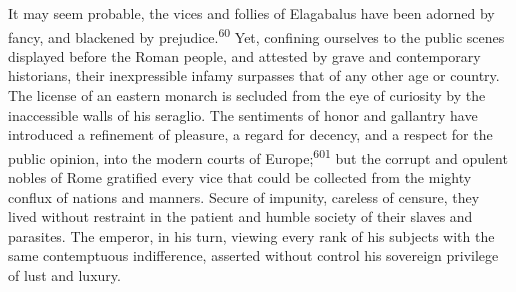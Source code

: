 
It may seem probable, the vices and follies of Elagabalus have
been adorned by fancy, and blackened by prejudice.\textsuperscript{60} Yet,
confining ourselves to the public scenes displayed before the
Roman people, and attested by grave and contemporary historians,
their inexpressible infamy surpasses that of any other age or
country. The license of an eastern monarch is secluded from the
eye of curiosity by the inaccessible walls of his seraglio. The
sentiments of honor and gallantry have introduced a refinement of
pleasure, a regard for decency, and a respect for the public
opinion, into the modern courts of Europe;\textsuperscript{601} but the corrupt
and opulent nobles of Rome gratified every vice that could be
collected from the mighty conflux of nations and manners. Secure
of impunity, careless of censure, they lived without restraint in
the patient and humble society of their slaves and parasites. The
emperor, in his turn, viewing every rank of his subjects with the
same contemptuous indifference, asserted without control his
sovereign privilege of lust and luxury.



